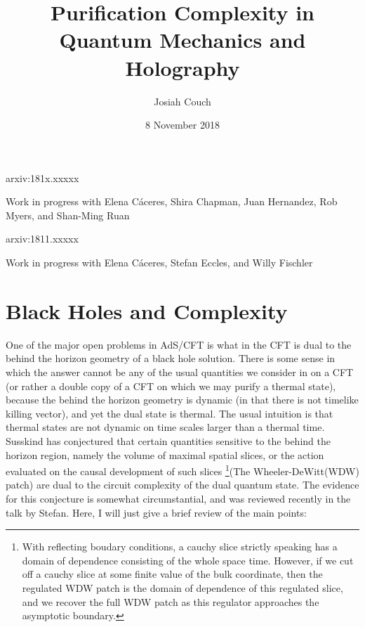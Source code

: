 \documentclass[12pt]{amsart}
\author{Josiah Couch}
\date{8 November 2018}
\begin{document}
\title{Purification Complexity in Quantum Mechanics and Holography}

\maketitle

\centerline{arxiv:181x.xxxxx}

\centerline{Work in progress with Elena C\'aceres, Shira Chapman, Juan Hernandez, Rob Myers, and Shan-Ming Ruan}

\centerline{arxiv:1811.xxxxx}

\centerline{Work in progress with Elena C\'aceres, Stefan Eccles, and Willy Fischler}

\tableofcontents

\section{Black Holes and Complexity}

One of the major open problems in AdS/CFT is what in the CFT is dual to the behind the horizon geometry of a black hole solution. There is some sense in which the answer cannot be any of the usual quantities we consider in on a CFT (or rather a double copy of a CFT on which we may purify a thermal state), because the behind the horizon geometry is dynamic (in that there is not timelike killing vector), and yet the dual state is thermal. The usual intuition is that thermal states are not dynamic on time scales larger than a thermal time. Susskind has conjectured that certain quantities sensitive to the behind the horizon  region, namely the volume of maximal spatial slices, or the action evaluated on the causal development of such slices \footnote{With reflecting boudary conditions, a cauchy slice strictly speaking has a domain of dependence consisting of the whole space time. However, if we cut off a cauchy slice at some finite value of the bulk coordinate, then the regulated WDW patch is the domain of dependence of this regulated slice, and we recover the full WDW patch as this regulator approaches the asymptotic boundary.}(The Wheeler-DeWitt(WDW) patch) are dual to the circuit complexity of the dual quantum state. The evidence for this conjecture is somewhat circumstantial, and was reviewed recently in the talk by Stefan. Here, I will just give a brief review of the main points: 
\end{document}
